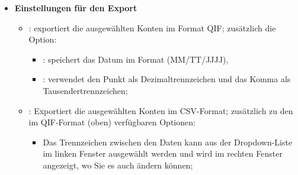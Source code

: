 \begin{enumerate}
\begin{itemize}
			\item \textbf{Einstellungen für den Export}%
				\begin{itemize}
					\item {}: exportiert die ausgewählten Konten im Format \gls{QIF}; zusätzlich die Option:
						\begin{itemize}
							\item {}: speichert das Datum im Format  (MM/TT/JJJJ),
							\item {}: verwendet den Punkt  als Dezimaltrennzeichen und das Komma \dequote{,} als Tausendertrennzeichen;
						\end{itemize}
					\item {}: Exportiert die ausgewählten Konten im \gls{CSV}-Format; zusätzlich zu den im QIF-Format (oben) verfügbaren Optionen:
						\begin{itemize}
							\item Das Trennzeichen zwischen den Daten kann aus der Dropdown-Liste im linken Fenster ausgewählt werden und wird im rechten Fenster angezeigt, wo Sie es auch ändern können;

\end{itemize}
\end{itemize}
\end{itemize}
\end{enumerate}
